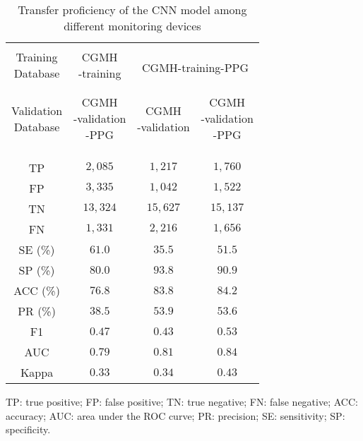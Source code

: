 \documentclass[10pt,a4paper,english]{amsart}
\begin{document}
\begin{table}
\caption{Transfer proficiency of the CNN model among different monitoring devices}
\label{Table:PPG}
\begin{center}
\begin{small}
\begin{tabular}{c|c cc}
\hline\\ [-0.8em]
\multirowcell{2}{Training\\Database} & \multirowcell{2}{CGMH\\-training} & \multicolumn{2}{c}{\multirow{2}{*}{CGMH-training-PPG}} \\ \\
\hline \\ [-0.8em]
\multirowcell{3}{Validation\\Database} & \multirowcell{3}{CGMH\\-validation\\-PPG}
& \multirowcell{3}{CGMH\\-validation} & \multirowcell{3}{CGMH\\-validation\\-PPG} \\ \\ \\ 
\hline\\ [-0.8em] 
TP   & $2,085$ & $1,217$ & $1,760$\\
FP   & $3,335$ & $1,042$ & $1,522$ \\
TN   & $13,324$ & $15,627$ & $15,137$\\
FN   & $1,331$ & $2,216$ & $1,656$\\[0.6em]
SE (\%) & $61.0$ & $35.5$ & $51.5$\\
SP (\%)  & $80.0$ & $93.8$ & $90.9$ \\ 
ACC (\%)   & $76.8$ & $83.8$ & $84.2$\\[0.6em]
PR (\%)   & $38.5$& $53.9$ & $53.6$ \\
F1    & $0.47$ & $0.43$ & $0.53$\\
AUC     & $0.79$ & $0.81$ & $0.84$ \\
Kappa    & $0.33$ & $0.34$ & $0.43$\\
[0.2em]
\hline
\end{tabular}
\end{small}
\end{center}
\vspace{0.1in}
\begin{footnotesize}
TP: true positive; FP: false positive; TN: true negative; FN: false negative; ACC: accuracy; AUC: area under the ROC curve; PR: precision; SE: sensitivity; SP: specificity.
\end{footnotesize}
\end{table}
\end{document}
